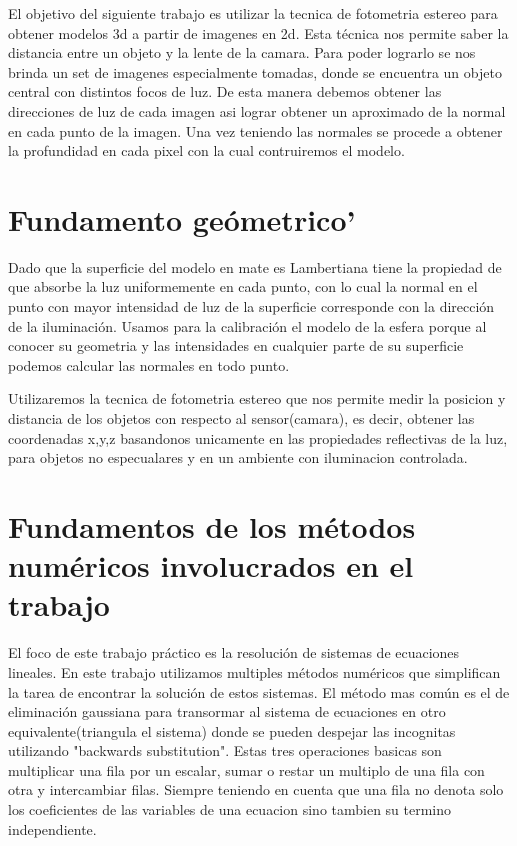 El objetivo del siguiente trabajo es utilizar la tecnica de fotometria estereo para obtener modelos 3d a partir de imagenes en 2d. Esta técnica nos permite saber la distancia entre un objeto y la lente de la camara. Para poder lograrlo se nos brinda un set de imagenes especialmente tomadas, donde se encuentra un objeto central con distintos focos de luz.
De esta manera debemos obtener las direcciones de luz de cada imagen asi lograr obtener un aproximado de la normal en cada punto de la imagen. Una vez teniendo las normales se procede a obtener la profundidad en cada pixel con la cual contruiremos el modelo.


\section{Fundamento geómetrico'}
Dado que la superficie del modelo en mate es Lambertiana tiene la propiedad de que absorbe la luz uniformemente en cada punto, con lo cual la normal en el punto con mayor intensidad de luz de la superficie corresponde con la dirección de la iluminación. Usamos para la calibración el modelo de la esfera porque al conocer su geometria y las intensidades en cualquier parte de su superficie podemos calcular las normales en todo punto.

Utilizaremos la tecnica de fotometria estereo que nos permite medir la posicion y distancia de los objetos con respecto al sensor(camara), es decir, obtener las coordenadas x,y,z basandonos unicamente en las propiedades reflectivas de la luz, para objetos no especualares y en un ambiente con iluminacion controlada.


\section{Fundamentos de los métodos numéricos involucrados en el trabajo}


El foco de este trabajo práctico es la resolución de sistemas de ecuaciones lineales.
En este trabajo utilizamos multiples métodos numéricos que simplifican la tarea de encontrar la solución de estos sistemas. 
El método mas común es el de eliminación gaussiana para transormar al sistema de ecuaciones en otro equivalente(triangula el sistema) donde se pueden despejar las incognitas utilizando "backwards substitution". 
Estas tres operaciones basicas son multiplicar una fila por un escalar, sumar o restar un multiplo de una fila con otra y intercambiar filas. Siempre teniendo en cuenta que una fila no denota solo los coeficientes de las variables de una ecuacion sino tambien su termino independiente.




